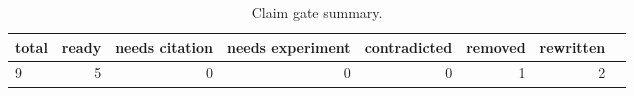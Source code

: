 \begin{table}[t]
\small
\caption{Claim gate summary.}
\label{tab:claim-gate}
\begin{tabular}{lrrrrrrr}
\hline
total & ready & needs citation & needs experiment & contradicted & removed & rewritten \\
\hline
9 & 5 & 0 & 0 & 0 & 1 & 2 \\
\hline
\end{tabular}
\end{table}
